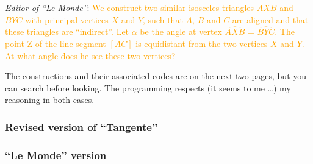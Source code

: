 \emph{Editor of  \enquote{Le Monde}}: \textcolor{orange}{We construct two similar
isosceles triangles $AXB$ and $BYC$ with principal vertices $X$ and $Y$, such
that $A$, $B$ and $C$ are aligned and that these triangles are \enquote{indirect}. Let
$\alpha$ be the angle at vertex $\widehat{AXB}$ = $\widehat{BYC}$. The point Z
of the line segment $[AC]$ is equidistant from the two vertices $X$ and $Y$.\\
At what angle does he see these two vertices?}

\vspace*{2cm}
The constructions and their associated codes are on the next two pages, but
you can search before looking. The programming respects (it seems to me \dots)
my reasoning in both cases.

\newpage

\subsubsection{Revised version of \enquote{Tangente}}

\begin{tkzexample}[small]
\end{tkzexample}

\newpage

\subsubsection{\enquote{Le Monde} version}

